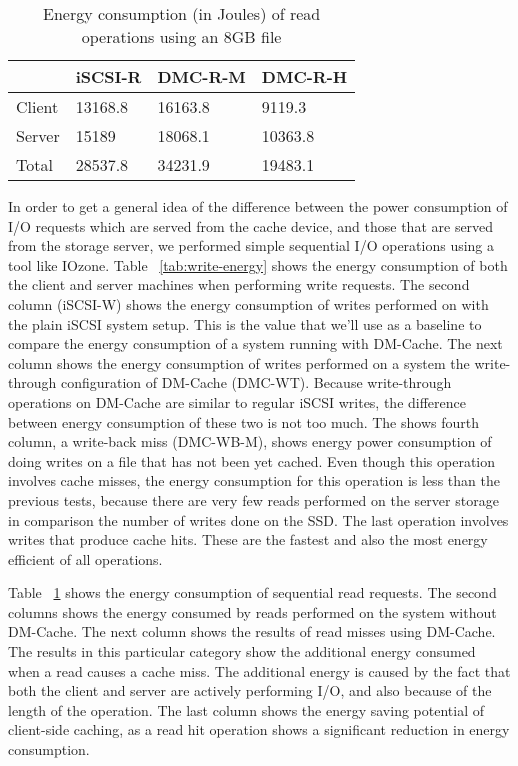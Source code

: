 \begin{table}
  \centering
  \resizebox{\linewidth}{!}
  {
    \begin{tabular}{|l|l|l|l|}
      \hline & \bf iSCSI-R & \bf DMC-R-M & \bf DMC-R-H \\ \hline
      Client & 13168.8     & 16163.8     & 9119.3      \\ \hline
      Server & 15189       & 18068.1     & 10363.8     \\ \hline
      Total  & 28537.8     & 34231.9     & 19483.1     \\ \hline
    \end{tabular}
  }
  \caption{Energy consumption (in Joules) of read operations using an 8GB file}
  \label{tab:read-energy}
\end{table}

In order to get a general idea of the difference between the power consumption
of I/O requests which are served from the cache device, and those that are
served from the storage server, we performed simple sequential I/O operations
using a tool like IOzone. Table ~\ref{tab:write-energy} shows the energy
consumption of both the client and server machines when performing write
requests. The second column (iSCSI-W) shows the energy consumption of writes
performed on with the plain iSCSI system setup. This is the value that we'll use
as a baseline to compare the energy consumption of a system running with
DM-Cache. The next column shows the energy consumption of writes performed on a
system the write-through configuration of DM-Cache (DMC-WT).  Because
write-through operations on DM-Cache are similar to regular iSCSI writes, the
difference between energy consumption of these two is not too much.  The shows
fourth column, a write-back miss (DMC-WB-M), shows energy power consumption of
doing writes on a file that has not been yet cached. Even though this operation
involves cache misses, the energy consumption for this operation is less than
the previous tests, because there are very few reads performed on the server
storage in comparison the number of writes done on the SSD. The last operation
involves writes that produce cache hits. These are the fastest and also the most
energy efficient of all operations.

Table ~\ref{tab:read-energy} shows the energy consumption of sequential read
requests. The second columns shows the energy consumed by reads performed on the
system without DM-Cache. The next column shows the results of read misses using
DM-Cache. The results in this particular category show the additional energy
consumed when a read causes a cache miss. The additional energy is caused by the
fact that both the client and server are actively performing I/O, and also
because of the length of the operation. The last column shows the energy saving
potential of client-side caching, as a read hit operation shows a significant
reduction in energy consumption.

